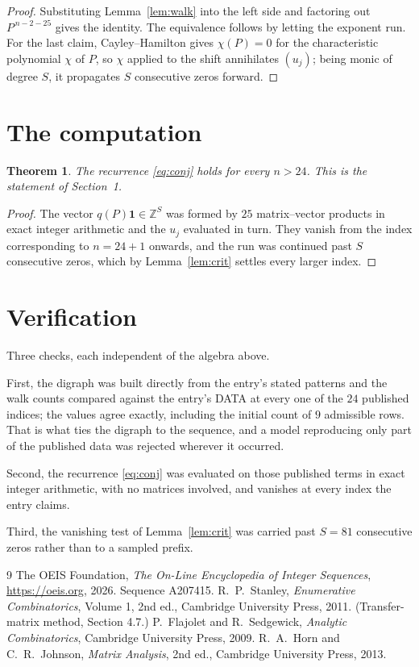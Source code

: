 \documentclass[11pt,a4paper]{article}
\theoremstyle{plain}
\newtheorem{theorem}{Theorem}
\theoremstyle{definition}
\begin{document}
\begin{proof}
Substituting Lemma~\ref{lem:walk} into the left side and factoring out
$P^{\,n-2-25}$ gives the identity. The equivalence follows by letting the exponent
run. For the last claim, Cayley--Hamilton gives $\chi(P)=0$ for the characteristic
polynomial $\chi$ of $P$, so $\chi$ applied to the shift annihilates $(u_j)$; being monic of
degree $S$, it propagates $S$ consecutive zeros forward.
\end{proof}

\section{The computation}

\begin{theorem}
The recurrence \eqref{eq:conj} holds for every $n>24$. This is the statement of
Section~1.
\end{theorem}

\begin{proof}
The vector $q(P)\mathbf{1}\in\mathbb{Z}^{S}$ was formed by $25$ matrix--vector
products in exact integer arithmetic and the $u_j$ evaluated in turn. They vanish from the
index corresponding to $n=24+1$ onwards, and the run was continued past $S$ consecutive
zeros, which by Lemma~\ref{lem:crit} settles every larger index.
\end{proof}

\section{Verification}

Three checks, each independent of the algebra above.

First, the digraph was built directly from the entry's stated patterns and the walk counts
compared against the entry's DATA at every one of the $24$ published indices; the
values agree exactly, including the initial count of $9$ admissible rows. That is
what ties the digraph to the sequence, and a model reproducing only part of the published
data was rejected wherever it occurred.

Second, the recurrence \eqref{eq:conj} was evaluated on those published terms in exact
integer arithmetic, with no matrices involved, and vanishes at every index the entry claims.

Third, the vanishing test of Lemma~\ref{lem:crit} was carried past $S=81$ consecutive
zeros rather than to a sampled prefix.

\begin{thebibliography}{9}
 The OEIS Foundation, \emph{The On-Line Encyclopedia of Integer
Sequences}, \url{https://oeis.org}, 2026. Sequence A207415.
 R.~P.~Stanley, \emph{Enumerative Combinatorics}, Volume 1, 2nd ed.,
Cambridge University Press, 2011. (Transfer-matrix method, Section 4.7.)
 P.~Flajolet and R.~Sedgewick, \emph{Analytic Combinatorics}, Cambridge
University Press, 2009.
 R.~A.~Horn and C.~R.~Johnson, \emph{Matrix Analysis}, 2nd ed., Cambridge
University Press, 2013.
\end{thebibliography}
\end{document}
